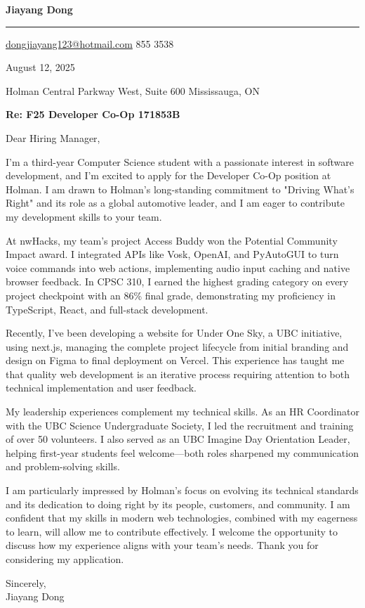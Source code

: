 \documentclass[letterpaper,12pt]{article}
\begin{document}
    \color{almost_black}
    
    {\fontsize{24pt}{28pt}\selectfont \textbf{Jiayang Dong} \par}
    \vspace{-5.3mm}
    \noindent\rule{\linewidth}{1.5pt}
    \vspace{3mm}
    \href{mailto:dongjiayang123@hotmail.com}{dongjiayang123@hotmail.com}  855 3538

    \vspace{-2.3mm}
    August 12, 2025

    Holman  Central Parkway West, Suite 600 \newline
    Mississauga, ON

    \textbf{Re: F25 Developer Co-Op 171853B}
    
    Dear Hiring Manager,
     
    I'm a third-year Computer Science student with a passionate interest in software development, and I'm excited to apply for the Developer Co-Op position at Holman. I am drawn to Holman's long-standing commitment to "Driving What's Right" and its role as a global automotive leader, and I am eager to contribute my development skills to your team.
    
    At nwHacks, my team's project Access Buddy won the Potential Community Impact award. I integrated APIs like Vosk, OpenAI, and PyAutoGUI to turn voice commands into web actions, implementing audio input caching and native browser feedback. In CPSC 310, I earned the highest grading category on every project checkpoint with an 86\% final grade, demonstrating my proficiency in TypeScript, React, and full-stack development.
    
    Recently, I’ve been developing a website for Under One Sky, a UBC initiative, using next.js, managing the complete project lifecycle from initial branding and design on Figma to final deployment on Vercel. This experience has taught me that quality web development is an iterative process requiring attention to both technical implementation and user feedback.
    
    My leadership experiences complement my technical skills. As an HR Coordinator with the UBC Science Undergraduate Society, I led the recruitment and training of over 50 volunteers. I also served as an UBC Imagine Day Orientation Leader, helping first-year students feel welcome—both roles sharpened my communication and problem-solving skills.
    
    I am particularly impressed by Holman's focus on evolving its technical standards and its dedication to doing right by its people, customers, and community. I am confident that my skills in modern web technologies, combined with my eagerness to learn, will allow me to contribute effectively. I welcome the opportunity to discuss how my experience aligns with your team's needs. Thank you for considering my application.
    
    Sincerely, \\
    Jiayang Dong 
\end{document}

